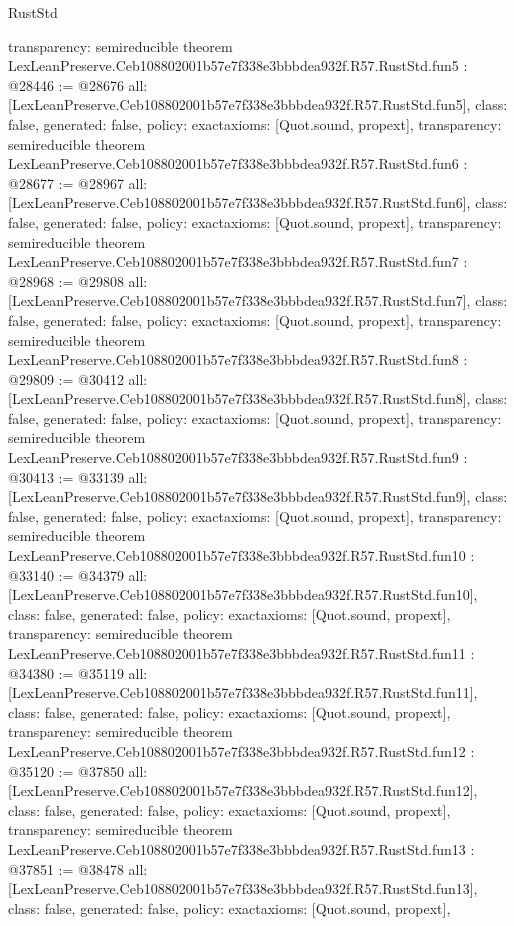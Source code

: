 \begin{lexlean}{RustStd}
\begin{coremodule}
{  transparency: semireducible
}
theorem LexLeanPreserve.Ceb108802001b57e7f338e3bbbdea932f.R57.RustStd.fun5 : @28446 := @28676 {
  all: [LexLeanPreserve.Ceb108802001b57e7f338e3bbbdea932f.R57.RustStd.fun5],
  class: false,
  generated: false,
  policy: exact{axioms: [Quot.sound, propext]},
  transparency: semireducible
}
theorem LexLeanPreserve.Ceb108802001b57e7f338e3bbbdea932f.R57.RustStd.fun6 : @28677 := @28967 {
  all: [LexLeanPreserve.Ceb108802001b57e7f338e3bbbdea932f.R57.RustStd.fun6],
  class: false,
  generated: false,
  policy: exact{axioms: [Quot.sound, propext]},
  transparency: semireducible
}
theorem LexLeanPreserve.Ceb108802001b57e7f338e3bbbdea932f.R57.RustStd.fun7 : @28968 := @29808 {
  all: [LexLeanPreserve.Ceb108802001b57e7f338e3bbbdea932f.R57.RustStd.fun7],
  class: false,
  generated: false,
  policy: exact{axioms: [Quot.sound, propext]},
  transparency: semireducible
}
theorem LexLeanPreserve.Ceb108802001b57e7f338e3bbbdea932f.R57.RustStd.fun8 : @29809 := @30412 {
  all: [LexLeanPreserve.Ceb108802001b57e7f338e3bbbdea932f.R57.RustStd.fun8],
  class: false,
  generated: false,
  policy: exact{axioms: [Quot.sound, propext]},
  transparency: semireducible
}
theorem LexLeanPreserve.Ceb108802001b57e7f338e3bbbdea932f.R57.RustStd.fun9 : @30413 := @33139 {
  all: [LexLeanPreserve.Ceb108802001b57e7f338e3bbbdea932f.R57.RustStd.fun9],
  class: false,
  generated: false,
  policy: exact{axioms: [Quot.sound, propext]},
  transparency: semireducible
}
theorem LexLeanPreserve.Ceb108802001b57e7f338e3bbbdea932f.R57.RustStd.fun10 : @33140 := @34379 {
  all: [LexLeanPreserve.Ceb108802001b57e7f338e3bbbdea932f.R57.RustStd.fun10],
  class: false,
  generated: false,
  policy: exact{axioms: [Quot.sound, propext]},
  transparency: semireducible
}
theorem LexLeanPreserve.Ceb108802001b57e7f338e3bbbdea932f.R57.RustStd.fun11 : @34380 := @35119 {
  all: [LexLeanPreserve.Ceb108802001b57e7f338e3bbbdea932f.R57.RustStd.fun11],
  class: false,
  generated: false,
  policy: exact{axioms: [Quot.sound, propext]},
  transparency: semireducible
}
theorem LexLeanPreserve.Ceb108802001b57e7f338e3bbbdea932f.R57.RustStd.fun12 : @35120 := @37850 {
  all: [LexLeanPreserve.Ceb108802001b57e7f338e3bbbdea932f.R57.RustStd.fun12],
  class: false,
  generated: false,
  policy: exact{axioms: [Quot.sound, propext]},
  transparency: semireducible
}
theorem LexLeanPreserve.Ceb108802001b57e7f338e3bbbdea932f.R57.RustStd.fun13 : @37851 := @38478 {
  all: [LexLeanPreserve.Ceb108802001b57e7f338e3bbbdea932f.R57.RustStd.fun13],
  class: false,
  generated: false,
  policy: exact{axioms: [Quot.sound, propext]},
}
\end{coremodule}
\end{lexlean}

